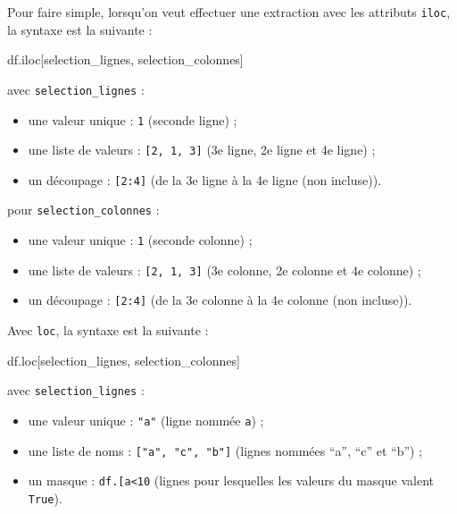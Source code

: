 \documentclass[
  12pt,
]{book}
\newenvironment{Shaded}{\begin{snugshade}}{\end{snugshade}}
\newcommand{\NormalTok}[1]{#1}
\providecommand{\tightlist}{%
  \setlength{\itemsep}{0pt}\setlength{\parskip}{0pt}}
\numberwithin{equation}{section}
\numberwithin{countremarque}{section}
\begin{document}
Pour faire simple, lorsqu'on veut effectuer une extraction avec les attributs \texttt{iloc}, la syntaxe est la suivante :

\begin{Shaded}
\begin{Highlighting}[]
\NormalTok{df.iloc[selection\_lignes, selection\_colonnes]}
\end{Highlighting}
\end{Shaded}

avec \texttt{selection\_lignes} :

\begin{itemize}
\tightlist
\item
  une valeur unique : \texttt{1} (seconde ligne) ;
\item
  une liste de valeurs : \texttt{{[}2,\ 1,\ 3{]}} (3e ligne, 2e ligne et 4e ligne) ;
\item
  un découpage : \texttt{{[}2:4{]}} (de la 3e ligne à la 4e ligne (non incluse)).
\end{itemize}

pour \texttt{selection\_colonnes} :

\begin{itemize}
\tightlist
\item
  une valeur unique : \texttt{1} (seconde colonne) ;
\item
  une liste de valeurs : \texttt{{[}2,\ 1,\ 3{]}} (3e colonne, 2e colonne et 4e colonne) ;
\item
  un découpage : \texttt{{[}2:4{]}} (de la 3e colonne à la 4e colonne (non incluse)).
\end{itemize}

Avec \texttt{loc}, la syntaxe est la suivante :

\begin{Shaded}
\begin{Highlighting}[]
\NormalTok{df.loc[selection\_lignes, selection\_colonnes]}
\end{Highlighting}
\end{Shaded}

avec \texttt{selection\_lignes} :

\begin{itemize}
\tightlist
\item
  une valeur unique : \texttt{"a"} (ligne nommée \texttt{a}) ;
\item
  une liste de noms : \texttt{{[}"a",\ "c",\ "b"{]}} (lignes nommées ``a'', ``c'' et ``b'') ;
\item
  un masque : \texttt{df.{[}\textquotesingle{}a\textquotesingle{}{]}\textless{}10} (lignes pour lesquelles les valeurs du masque valent \texttt{True}).
\end{itemize}
\end{document}
